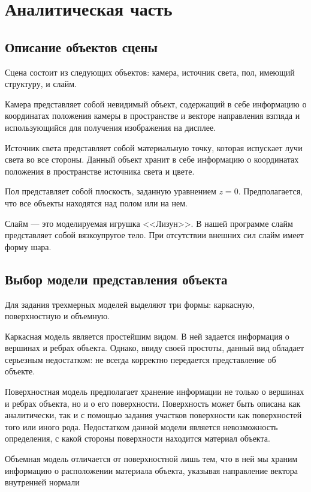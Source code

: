 \chapter{Аналитическая часть}

\section{Описание объектов сцены}

Сцена состоит из следующих объектов: камера, источник света, пол, имеющий структуру, и слайм.

Камера представляет собой невидимый объект, содержащий в себе информацию о координатах положения камеры в пространстве и векторе направления взгляда и использующийся для получения изображения на дисплее.

Источник света представляет собой материальную точку, которая испускает лучи света во все стороны. Данный объект хранит в себе информацию о координатах положения в пространстве источника света и цвете.

Пол представляет собой плоскость, заданную уравнением $z = 0$. Предполагается, что все объекты находятся над полом или на нем.

Слайм --- это моделируемая игрушка <<Лизун>>. В нашей программе слайм представляет собой вязкоупругое тело. При отсутствии внешних сил слайм имеет форму шара.

\section{Выбор модели представления объекта}

Для задания трехмерных моделей выделяют три формы: каркасную, поверхностную и объемную.

Каркасная модель является простейшим видом. В ней задается информация о вершинах и ребрах объекта. Однако, ввиду своей простоты, данный вид обладает серьезным недостатком: не всегда корректно передается представление об объекте.

Поверхностная модель предполагает хранение информации не только о вершинах и ребрах объекта, но и о его поверхности. Поверхность может быть описана как аналитически, так и с помощью задания участков поверхности как поверхностей того или иного рода. Недостатком данной модели является невозможность определения, с какой стороны поверхности находится материал объекта.

Объемная модель отличается от поверхностной лишь тем, что в ней мы храним информацию о расположении материала объекта, указывая направление вектора внутренней нормали

